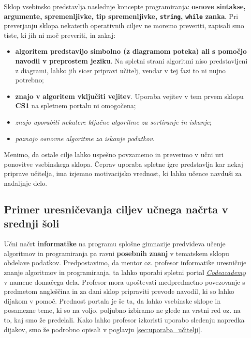 Sklop vsebinsko predstavlja naslednje koncepte programiranja:
\textbf{osnove sintakse, argumente, spremenljivke, tip
  spremenljivke, \texttt{string}, \texttt{while} zanka}. Pri
preverjanju sklopa nekaterih operativnih ciljev ne moremo preveriti,
zapisali smo tiste, ki jih ni moč preveriti, in zakaj:

\begin{itemize}
\tightlist
\item \textbf{algoritem predstavijo simbolno (z diagramom poteka) ali s
  pomočjo navodil v preprostem jeziku}. Na spletni strani algoritmi
niso predstavljeni z diagrami, lahko jih sicer pripravi učitelj,
vendar v tej fazi to ni nujno potrebno;
\item \textbf{znajo v algoritem vključiti vejitev}. Uporaba vejitev v
  tem prvem sklopu \textbf{CS1} na spletnem portalu ni omogočena;
\item \emph{znajo uporabiti nekatere ključne algoritme za sortiranje in
  iskanje};
\item \emph{poznajo osnovne algoritme za iskanje podatkov}.
\end{itemize}

Menimo, da ostale cilje lahko uspešno povzamemo in preverimo v učni
uri ponovitve vsebinskega sklopa. Čeprav uporaba spletne igre
predstavlja kar nekaj priprave učitelja, ima izjemno motivacijsko
vrednost, ki lahko učence navduši za nadaljnje delo.

\subsection{Primer uresničevanja ciljev učnega načrta v srednji šoli}
\label{sec:prim-uresn-cil-ss}

Učni načrt \textbf{informatike} na programu splošne gimnazije
predvideva učenje algoritmov in programiranja pa ravni
\textbf{posebnih znanj} v tematskem sklopu obdelave
podatkov. Predpostavimo, da mentor oz. profesor informatike
uresničuje znanje algoritmov in programiranja, ta lahko uporabi
spletni portal \emph{\href{https://www.codecademy.com/}{Codeacademy}}
\cite{web:codeacademy} v namene domačega dela. Profesor mora
upoštevati medpredmetno povezovanje s predmetom angleščina in za dani
sklop pripraviti prevode navodil, ki so lahko dijakom v
pomoč. Prednost portala je še ta, da lahko vsebinske sklope in posamezne
teme, ki so na voljo, poljubno izbiramo ne glede na vrstni red
oz. na to, kaj smo že predelali. Kako lahko profesor izkoristi uporabo
sledenju napredka dijakov, smo že podrobno opisali v poglavju
\ref{sec:uporaba_učitelji}.


